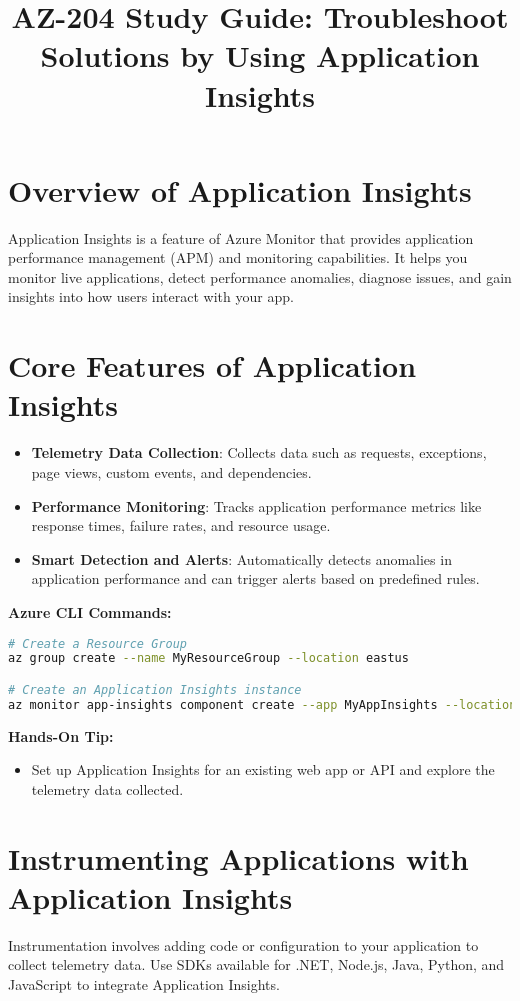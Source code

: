 \documentclass{article}
\title{AZ-204 Study Guide: Troubleshoot Solutions by Using Application Insights}
\author{}
\date{}
\begin{document}
\maketitle

\section{Overview of Application Insights}
Application Insights is a feature of Azure Monitor that provides application performance management (APM) and monitoring capabilities. It helps you monitor live applications, detect performance anomalies, diagnose issues, and gain insights into how users interact with your app.

\section{Core Features of Application Insights}
\begin{itemize}
    \item \textbf{Telemetry Data Collection}: Collects data such as requests, exceptions, page views, custom events, and dependencies.
    \item \textbf{Performance Monitoring}: Tracks application performance metrics like response times, failure rates, and resource usage.
    \item \textbf{Smart Detection and Alerts}: Automatically detects anomalies in application performance and can trigger alerts based on predefined rules.
\end{itemize}

\textbf{Azure CLI Commands:}
\begin{lstlisting}[language=bash]
# Create a Resource Group
az group create --name MyResourceGroup --location eastus

# Create an Application Insights instance
az monitor app-insights component create --app MyAppInsights --location eastus --resource-group MyResourceGroup --application-type web
\end{lstlisting}

\textbf{Hands-On Tip:}
\begin{itemize}
    \item Set up Application Insights for an existing web app or API and explore the telemetry data collected.
\end{itemize}

\section{Instrumenting Applications with Application Insights}
Instrumentation involves adding code or configuration to your application to collect telemetry data. Use SDKs available for .NET, Node.js, Java, Python, and JavaScript to integrate Application Insights.
\end{document}
